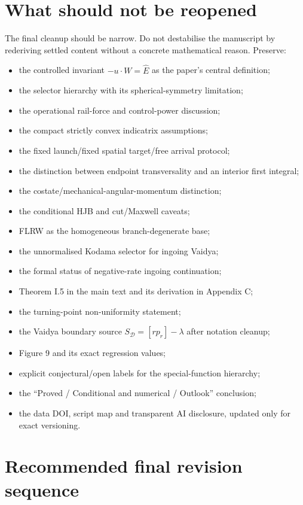 \documentclass[11pt,a4paper]{article}
\newcommand{\Ehat}{\hat E}
\newcommand{\SD}{S_{\mathcal D}}
\begin{document}
\clearpage
\section{What should not be reopened}

The final cleanup should be narrow. Do not destabilise the manuscript by rederiving settled
content without a concrete mathematical reason. Preserve:

\begin{itemize}
  \item the controlled invariant $-u\!\cdot\!W=\Ehat$ as the paper's central definition;
  \item the selector hierarchy with its spherical-symmetry limitation;
  \item the operational rail-force and control-power discussion;
  \item the compact strictly convex indicatrix assumptions;
  \item the fixed launch/fixed spatial target/free arrival protocol;
  \item the distinction between endpoint transversality and an interior first integral;
  \item the costate/mechanical-angular-momentum distinction;
  \item the conditional HJB and cut/Maxwell caveats;
  \item FLRW as the homogeneous branch-degenerate base;
  \item the unnormalised Kodama selector for ingoing Vaidya;
  \item the formal status of negative-rate ingoing continuation;
  \item Theorem I.5 in the main text and its derivation in Appendix C;
  \item the turning-point non-uniformity statement;
  \item the Vaidya boundary source $\SD=[rp_r]-\lambda$ after notation cleanup;
  \item Figure 9 and its exact regression values;
  \item explicit conjectural/open labels for the special-function hierarchy;
  \item the ``Proved / Conditional and numerical / Outlook'' conclusion;
  \item the data DOI, script map and transparent AI disclosure, updated only for exact versioning.
\end{itemize}

\clearpage
\section{Recommended final revision sequence}
\end{document}

